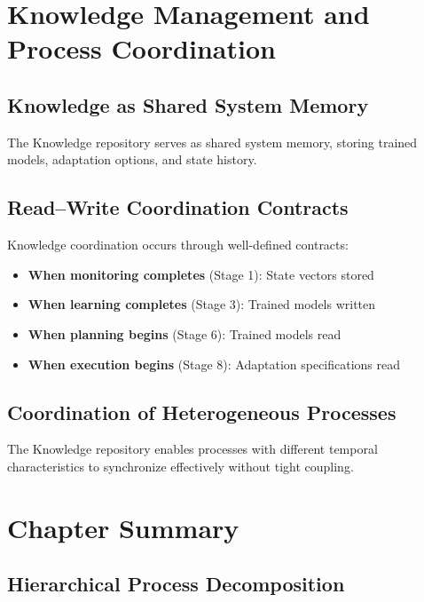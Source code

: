 \documentclass[11pt,a4paper]{article}
\begin{document}
\section{Knowledge Management and Process Coordination}
\label{sec:knowledge}

\subsection{Knowledge as Shared System Memory}

The Knowledge repository serves as shared system memory, storing trained models, adaptation options, and state history.

\subsection{Read--Write Coordination Contracts}

Knowledge coordination occurs through well-defined contracts:

\begin{itemize}
    \item \textbf{When monitoring completes} (Stage 1): State vectors stored
    \item \textbf{When learning completes} (Stage 3): Trained models written
    \item \textbf{When planning begins} (Stage 6): Trained models read
    \item \textbf{When execution begins} (Stage 8): Adaptation specifications read
\end{itemize}

\subsection{Coordination of Heterogeneous Processes}

The Knowledge repository enables processes with different temporal characteristics to synchronize effectively without tight coupling.


\section{Chapter Summary}
\label{sec:summary}

\subsection{Hierarchical Process Decomposition}
\end{document}
